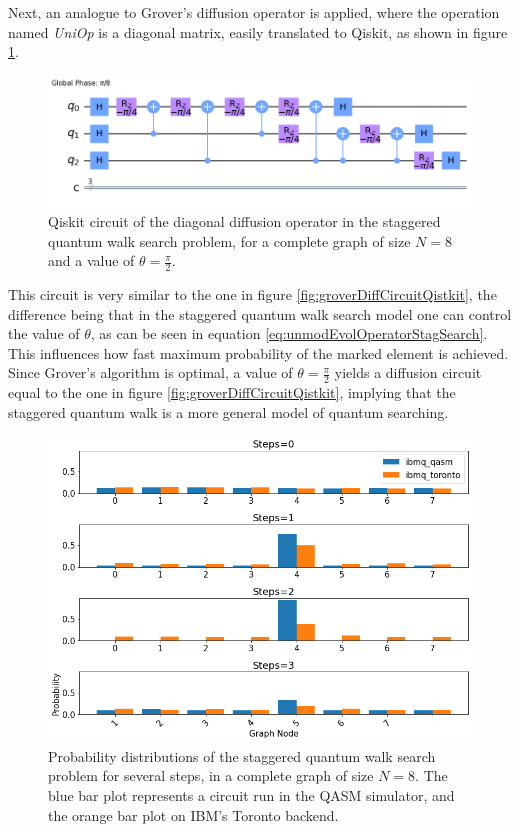 \documentclass[../../dissertation.tex]{subfiles}
\begin{document}
Next, an analogue to Grover's diffusion operator is applied, where the
operation named \textit{UniOp} is a diagonal matrix, easily translated to
Qiskit, as shown in figure \ref{fig:stagSearchUniOpCircQistkit}.  
\begin{figure}[!h]
	\centering
	\includegraphics[scale=0.40]{img/Qiskit/StaggeredQW/Search/Circuits/StagUniOpCircuit_N3_M0_S3.png}
	\caption{Qiskit circuit of the  diagonal diffusion operator in the staggered quantum walk search problem, for a complete graph of size $N=8$ and a value of $\theta = \frac{\pi}{2}$.}
	\label{fig:stagSearchUniOpCircQistkit}
\end{figure}
This circuit is very similar to the one in figure
\ref{fig:groverDiffCircuitQistkit}, the difference being that in the staggered
quantum walk search model one can control the value of $\theta$, as can be seen
in equation \eqref{eq:unmodEvolOperatorStagSearch}. This influences how fast
maximum probability of the marked element is achieved. Since Grover's algorithm
is optimal, a value of $\theta=\frac{\pi}{2}$ yields a diffusion circuit equal
to the one in figure \ref{fig:groverDiffCircuitQistkit}, implying that the
staggered quantum walk is a more general model of quantum searching.
\begin{figure}[!h]
	\centering
	\includegraphics[scale=0.40]{img/Qiskit/StaggeredQW/Search/stagSearchToronto_N3_S0123.png}
	\caption{Probability distributions of the staggered quantum walk search problem for several steps, in a complete graph of size $N=8$. The blue bar plot represents a circuit run in the QASM simulator, and the orange bar plot on IBM's Toronto backend.}
	\label{fig:stagSearchResultsToronto}
\end{figure}\par
\end{document}
